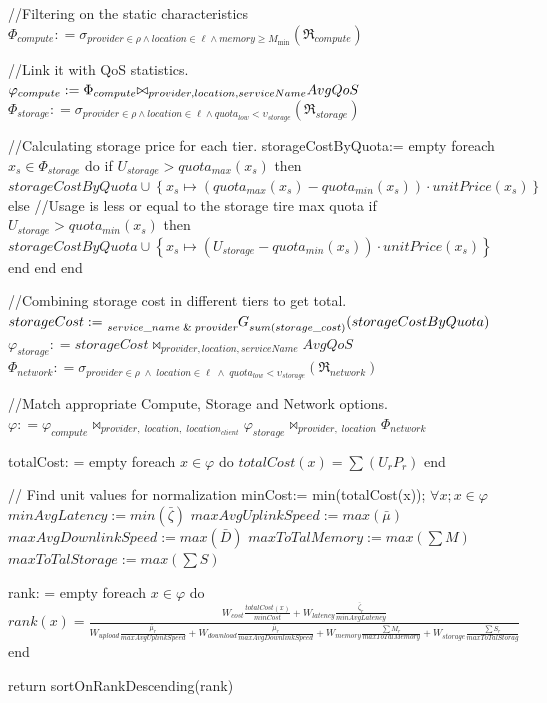 \begin{algorithm}[float,caption={orderedSolutions $( \ell , {M_{\min }} , price_{\max} , \rho , U , W )$}, label={algo:orderedSolutions}]
//Filtering on the static characteristics
${\Phi _{compute}}: = {\sigma _{provider \in \rho  \wedge location \in \ell  \wedge memory \ge {M_{\min }}}}\left( {{\Re _{compute}}} \right)$

//Link it with QoS statistics.
${\varphi _{compute}}: = {\Phi _{compute}}{{\rm \bowtie}_{provider,location,serviceName}}AvgQoS$
${\Phi _{storage}}: = {\sigma _{provider \in \rho  \wedge location \in \ell  \wedge quot{a_{low}} < {\upsilon _{storage}}}}\left( {{\Re _{storage}}} \right)$

//Calculating storage price for each tier.
storageCostByQuota:= empty
foreach ${x_s} \in {\Phi _{storage}}$ do
    if ${U_{storage}} > quota_{max}({x_s})$ then
        $storageCostByQuota \cup
        \left\{ x_s \mapsto ( quota_{max}(x_s) - quota_{min}(x_s) )\cdot unitPrice({x_s}) \right\}$
    else
        //Usage is less or equal to the storage tire max quota
        if ${U_{storage}} > quota_{min}({x_s})$ then
            $storageCostByQuota \cup
            \left\{ x_s \mapsto ( U_{storage} - quota_{min}(x_s) ) \cdot unitPrice(x_s) \right\}$
        end
    end 
end

//Combining storage cost in different tiers to get total.
$storageCost: = \tensor[_{service\_name\;\&\;provider}]{G}{_{sum(storage\_cost)}} (storageCostByQuota)$
${\varphi _{storage}}: = storageCost{\bowtie_{provider, location, serviceName}}AvgQoS$
${\Phi _{network}}: = {\sigma _{provider \in \rho\;\wedge\;location \in \ell\;\wedge\;quot{a_{low}} < {\upsilon _{storage}}}}({\Re _{network}})$

//Match appropriate Compute, Storage and Network options.
$\varphi : = {\varphi _{compute}}{\bowtie_{provider,\;location,\;location_{client}}}{\varphi _{storage}}{\bowtie_{provider,\;location}}{\Phi _{network}}$

totalCost: = empty
foreach $x \in \varphi$ do
    $totalCost(x) = \sum {( U_r P_r )}$
end

// Find unit values for normalization
minCost:= min(totalCost(x)); $\forall x ; x \in \varphi$
$minAvgLatency:=min(\bar \zeta)$
$maxAvgUplinkSpeed:=max(\bar \mu)$
$maxAvgDownlinkSpeed:=max(\bar D)$
$maxToTalMemory:=max(\sum M)$
$maxToTalStorage:=max(\sum S)$

rank: = empty
foreach $x \in \varphi$ do
    $rank(x) =
    \frac{
        W_{cost} \frac{totalCost(x)}{minCost}
        + W_{latency} \frac{\bar \zeta_r}{minAvgLatency} 
    }{
        W_{upload} \frac{\bar \mu_r}{maxAvgUplinkSpeed}
        + W_{download} \frac{\bar \mu_r}{maxAvgDownlinkSpeed}
        + W_{memory} \frac{\sum M_r}{maxToTalMemory}
        + W_{storage} \frac{\sum S_r}{maxToTalStorag}
    }
    $
end

return sortOnRankDescending(rank)
\end{algorithm}

